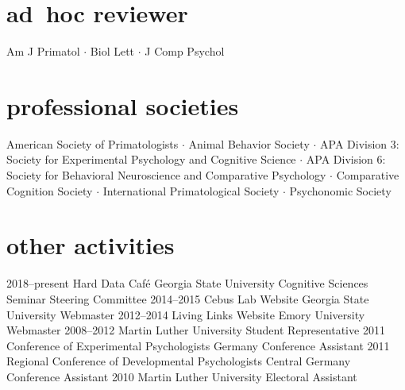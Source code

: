 \documentclass[]{friggeri-cv}
\begin{document}

\section{ad~hoc reviewer}
    Am J Primatol $\cdot$ Biol Lett $\cdot$ J Comp Psychol \\[.5cm]


\section{professional societies}
    American Society of Primatologists $\cdot$ %
    Animal Behavior Society $\cdot$ %
    APA Division 3: Society for Experimental Psychology and Cognitive Science $\cdot$ %
    APA Division 6: Society for Behavioral Neuroscience and Comparative Psychology $\cdot$ %
    Comparative Cognition Society $\cdot$ %
    International Primatological Society $\cdot$ %
    Psychonomic Society \\[.5cm]%

\section{other activities}

\begin{entrylist}
  \entry
    {2018--present}
    {Hard Data Café}
    {Georgia State University}
    {Cognitive Sciences Seminar Steering Committee}
  \entry
    {2014--2015}
    {Cebus Lab Website}
    {Georgia State University}
    {Webmaster}
  \entry
    {2012--2014}
    {Living Links Website}
    {Emory University}
    {Webmaster}
  \entry
    {2008--2012}
    {Martin Luther University}
    {}
    {Student Representative}
 \entry
   {2011}
   {Conference of Experimental Psychologists}
   {Germany}
   {Conference Assistant}
 \entry
   {2011}
   {Regional Conference of Developmental Psychologists}
   {Central Germany}
   {Conference Assistant}
 \entry
   {2010}
   {Martin Luther University}
   {}
   {Electoral Assistant}
\end{entrylist}
\end{document}
